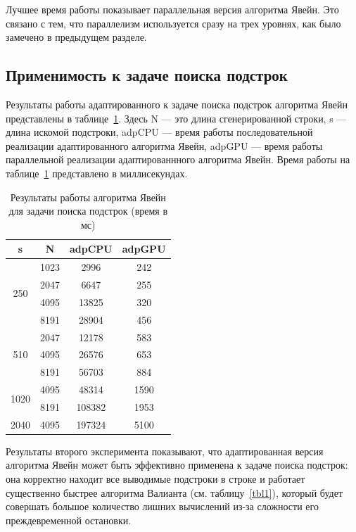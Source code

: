 \documentclass[14pt]{matmex-diploma-custom}
\begin{document}
Лучшее время работы показывает параллельная версия алгоритма Явейн. Это связано с тем, что параллелизм используется сразу на трех уровнях, как было замечено в предыдущем разделе. 

\subsection{Применимость к задаче поиска подстрок}

Результаты работы адаптированного к задаче поиска подстрок алгоритма Явейн представлены в таблице~\ref{tbl3}. Здесь N --– это длина сгенерированной строки, s --- длина искомой подстроки, adpCPU --- время работы последовательной реализации адаптированного алгоритма Явейн, adpGPU --- время работы параллельной реализации адаптированнного алгоритма Явейн.
Время работы на таблице~\ref{tbl3} представлено в миллисекундах.

\begin{table}[h]

\begin{center}
\caption{Результаты работы алгоритма Явейн для задачи поиска подстрок (время в мс)}
\label{tbl3}
    \begin{tabular}{ ||c||c||c|c|| } 
    \hline
    s & N & adpCPU &  adpGPU \\
    \hline
    \multirow{4}{2em}{250} & 1023 & 2996 & 242 \\ 
    & 2047 & 6647 & 255\\ 
    & 4095 & 13825 & 320\\ 
    & 8191 & 28904 & 456\\ 
    \hline
    \multirow{3}{2em}{510} & 2047 & 12178 & 583\\
    & 4095 & 26576 & 653\\
    & 8191 & 56703 & 884\\ 
    \hline
    \multirow{2}{2em}{1020} & 4095 & 48314 & 1590 \\
    & 8191 & 108382 & 1953\\ 
    \hline
    2040 & 4095 & 197324 & 5100\\ 
    \hline
    \end{tabular}
\end{center}

\end{table}


Результаты второго эксперимента показывают, что адаптированная версия алгоритма Явейн может быть эффективно применена к задаче поиска подстрок: она корректно находит все выводимые подстроки в строке и работает существенно быстрее алгоритма Валианта (см. таблицу~\ref{tbl1}), который будет совершать большое количество лишних вычислений из-за сложности его преждевременной остановки.
\end{document}
